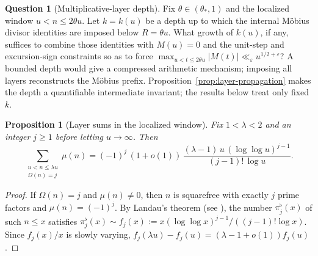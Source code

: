 \documentclass[11pt]{amsart}
\numberwithin{equation}{section}
\theoremstyle{plain}
\newtheorem{proposition}[theorem]{Proposition}
\theoremstyle{definition}
\newtheorem{question}[theorem]{Question}
\theoremstyle{remark}
\newcommand{\eps}{\varepsilon}
\begin{document}
\begin{question}[Multiplicative-layer depth]
\label{q:layer-depth}
Fix $\theta\in(\theta_*,1)$ and the localized window $u<n\le2\theta u$.
Let $k=k(u)$ be a depth up to which the internal M\"obius divisor identities
are imposed below $R=\theta u$. What growth of $k(u)$, if any, suffices to
combine those identities with $M(u)=0$ and the unit-step and excursion-sign
constraints so as to force
$\max_{u<t\le2\theta u}|M(t)|\ll_\eps u^{1/2+\eps}$? A bounded depth would
give a compressed arithmetic mechanism; imposing all layers reconstructs the
M\"obius prefix. Proposition~\ref{prop:layer-propagation} makes the depth a
quantifiable intermediate invariant; the results below treat only fixed
$k$.
\end{question}
\begin{proposition}[Layer sums in the localized window]
\label{prop:layer-sums}
Fix $1<\lambda<2$ and an integer $j\ge1$ before letting $u\to\infty$. Then
\begin{equation}
\label{eq:layer-sum}
\sum_{\substack{u<n\le\lambda u\\ \Omega(n)=j}}\mu(n)
=(-1)^j\,(1+o(1))\,\frac{(\lambda-1)\,u\,(\log\log u)^{j-1}}{(j-1)!\,\log u}.
\end{equation}
\end{proposition}

\begin{proof}
If $\Omega(n)=j$ and $\mu(n)\ne0$, then $n$ is squarefree with exactly $j$
prime factors and $\mu(n)=(-1)^j$. By Landau's theorem (see
\cite[Ch.~7]{MontgomeryVaughan2007}), the number $\pi_j^\flat(x)$ of such
$n\le x$ satisfies $\pi_j^\flat(x)\sim f_j(x):=x(\log\log x)^{j-1}/((j-1)!\log x)$.
Since $f_j(x)/x$ is slowly varying, $f_j(\lambda u)-f_j(u)=(\lambda-1+o(1))f_j(u)$.
\end{proof}
\end{document}
